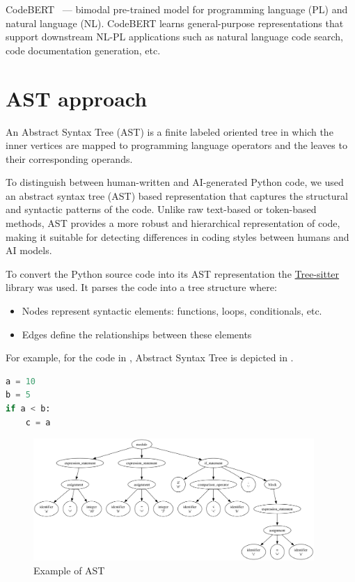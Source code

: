 \documentclass{article}
\begin{document}
CodeBERT~\cite{Feng2020} --- bimodal pre-trained model for programming language (PL) and natural language (NL). CodeBERT learns general-purpose representations that support downstream NL-PL applications such as natural language code search, code documentation generation, etc.

\section{AST approach}
An Abstract Syntax Tree (AST) is a finite labeled oriented tree in which the inner vertices are mapped to programming language operators and the leaves to their corresponding operands.

To distinguish between human-written and AI-generated Python code, we used an abstract syntax tree (AST) based representation that captures the structural and syntactic patterns of the code. Unlike raw text-based or token-based methods, AST provides a more robust and hierarchical representation of code, making it suitable for detecting differences in coding styles between humans and AI models.

To convert the Python source code into its AST representation the \href{https://tree-sitter.github.io/tree-sitter/}{Tree-sitter} library was used. It parses the code into a tree structure where:

\begin{itemize}
  \item Nodes represent syntactic elements: functions, loops, conditionals, etc.
  \item Edges define the relationships between these elements
\end{itemize}

For example, for the code in , Abstract Syntax Tree is depicted in .

\begin{minipage}{\linewidth}
  \begin{lstlisting}[language=Python,frame=single,caption=Python code snippet,label=lst:code_ast]
a = 10
b = 5
if a < b:
    c = a
\end{lstlisting}
\end{minipage}

\begin{figure}[H]
  \centering
  \includegraphics[width=0.95\textwidth]{./pictures/ast_output.png}
  \caption{Example of AST}\label{fig:ex_ast}
\end{figure}
\end{document}
